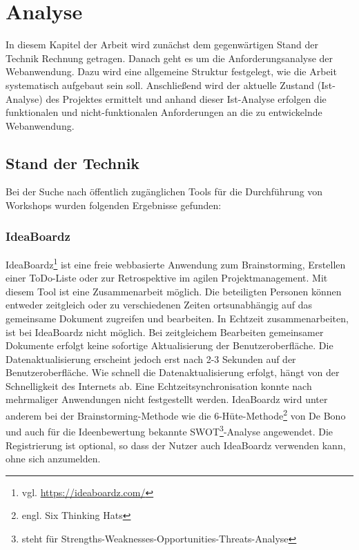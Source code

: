\chapter{Analyse}
\label{sec:analyse}
In diesem Kapitel der Arbeit wird zunächst dem gegenwärtigen Stand der Technik Rechnung getragen. Danach geht es um die Anforderungsanalyse der Webanwendung. Dazu wird eine allgemeine Struktur festgelegt, wie die Arbeit systematisch aufgebaut sein soll. Anschließend wird der aktuelle Zustand (Ist-Analyse) des Projektes ermittelt und anhand dieser Ist-Analyse erfolgen die funktionalen und nicht-funktionalen Anforderungen an die zu entwickelnde Webanwendung.

\section{Stand der Technik}
\label{sec:stand der technik}
Bei der Suche nach öffentlich zugänglichen Tools für die Durchführung von Workshops wurden folgenden Ergebnisse gefunden:

\subsection{IdeaBoardz}
\label{sec:ideaBoardz}
IdeaBoardz\footnote{vgl. \url{https://ideaboardz.com/}} ist eine freie webbasierte Anwendung zum Brainstorming, Erstellen einer ToDo-Liste oder zur Retrospektive im agilen Projektmanagement. Mit diesem Tool ist eine Zusammenarbeit möglich. Die beteiligten Personen können entweder zeitgleich oder zu verschiedenen Zeiten ortsunabhängig auf das gemeinsame Dokument zugreifen und bearbeiten. In Echtzeit zusammenarbeiten, ist bei IdeaBoardz nicht möglich. Bei zeitgleichem Bearbeiten gemeinsamer Dokumente erfolgt keine \glqq sofortige\grqq{} Aktualisierung der Benutzeroberfläche. Die Datenaktualisierung erscheint jedoch erst nach 2-3 Sekunden auf der Benutzeroberfläche. Wie schnell die Datenaktualisierung erfolgt, hängt von der Schnelligkeit des Internets ab. Eine Echtzeitsynchronisation konnte nach mehrmaliger Anwendungen nicht festgestellt werden. IdeaBoardz wird unter anderem bei der Brainstorming-Methode wie die 6-Hüte-Methode\footnote{engl. Six Thinking Hats} von De Bono und auch für die Ideenbewertung bekannte SWOT\footnote{steht für Strengths-Weaknesses-Opportunities-Threats-Analyse}-Analyse angewendet. Die Registrierung ist optional, so dass der Nutzer auch IdeaBoardz verwenden kann, ohne sich anzumelden.

